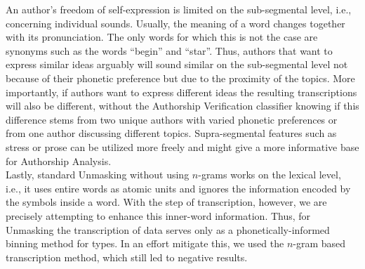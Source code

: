 An author's freedom of self-expression is limited on the sub-segmental level, i.e., concerning individual sounds.
Usually, the meaning of a word changes together with its pronunciation.
The only words for which this is not the case are synonyms such as the words ``begin'' and ``star''.
Thus, authors that want to express similar ideas arguably will sound similar on the sub-segmental level not because of their phonetic preference but due to the proximity of the topics.
More importantly, if authors want to express different ideas the resulting transcriptions will also be different, without the Authorship Verification classifier knowing if this difference stems from two unique authors with varied phonetic preferences or from one author discussing different topics.
Supra-segmental features such as stress or prose can be utilized more freely and might give a more informative base for Authorship Analysis.\\
Lastly, standard Unmasking without using $n$-grams works on the lexical level, i.e., it uses entire words as atomic units and ignores the information encoded by the symbols inside a word.
With the step of transcription, however, we are precisely attempting to enhance this inner-word information.
Thus, for Unmasking the transcription of data serves only as a phonetically-informed binning method for types.
In an effort mitigate this, we used the $n$-gram based transcription method, which still led to negative results.\\



